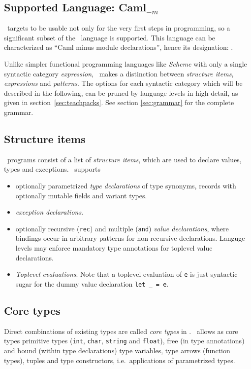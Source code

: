 \subsection{Supported Language: Caml$_{-m}$}
\label{sec:language}

\easyocaml\ targets to be usable not only for the very first steps in
programming, so a significant subset of the \ocaml\ language is supported.
This language can be characterized as ``Caml minus module declarations'',
hence its designation: \camlm.

Unlike simpler functional programming languages like \textit{Scheme} with only
a single syntactic category \emph{expression}, \ocaml\ makes a distinction
between \emph{structure items}, \emph{expressions} and \emph{patterns}.
The options for each syntactic category which will be described in the
following, can be pruned by language levels in high detail, as given in
section~\ref{sec:teachpacks}.
See section \ref{sec:grammar} for the complete grammar.


\subsection*{Structure items}

\ocaml\ programs consist of a list of \emph{structure items}, which are used to
declare values, types and exceptions.
\easyocaml\ supports
\begin{itemize}
  \item optionally parametrized \emph{type declarations} of type synonyms,
    records with optionally mutable fields and variant types.
  \item \emph{exception declarations}.
  \item optionally recursive (\texttt{rec}) and multiple (\texttt{and})
    \emph{value declarations}, where bindings occur in arbitrary patterns for
    non-recursive declarations.  Languge levels may enforce mandatory type
    annotations for toplevel value declarations.
  \item \emph{Toplevel evaluations}. Note that a toplevel evaluation of
    \texttt{e} is just syntactic sugar for the dummy value declaration
    \texttt{let \_ = e}.
\end{itemize}

\subsection*{Core types}
Direct combinations of existing types are called \emph{core types} in \ocaml.
\easyocaml\ allows as core types primitive types (\texttt{int}, \texttt{char},
\texttt{string} and \texttt{float}), free (in type annotations) and bound
(within type declarations) type variables, type arrows (function types), tuples
and type constructors, i.e.\ applications of parametrized types.

